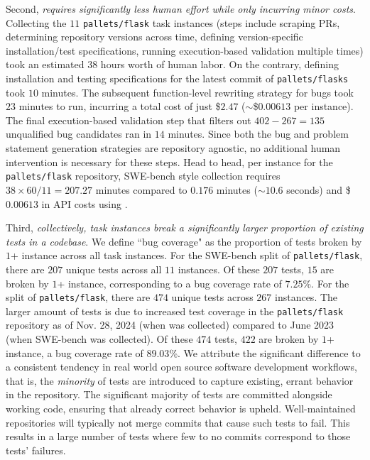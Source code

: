Second, \textit{\bugs{} requires significantly less human effort while only incurring minor costs}.
Collecting the $11$ \texttt{pallets/flask} task instances (steps include scraping PRs, determining repository versions across time, defining version-specific installation/test specifications, running execution-based validation multiple times) took an estimated $38$ hours worth of human labor.
On the contrary, defining installation and testing specifications for the latest commit of \texttt{pallets/flasks} took $10$ minutes. 
The subsequent function-level rewriting strategy for bugs took $23$ minutes to run, incurring a total cost of just \$$2.47$ ($\sim$\$$0.00613$ per instance).
The final execution-based validation step that filters out $402 - 267 = 135$ unqualified bug candidates ran in $14$ minutes.
Since both the bug and problem statement generation strategies are repository agnostic, no additional human intervention is necessary for these steps.
Head to head, per instance for the \texttt{pallets/flask} repository, SWE-bench style collection requires $38 \times 60 / 11 = 207.27$ minutes compared to $0.176$ minutes ($\sim10.6$ seconds) and \$$0.00613$ in API costs using \bugs{}.

Third, \textit{collectively, \bugs{} task instances break a significantly larger proportion of existing tests in a codebase}.
We define ``bug coverage" as the proportion of tests broken by $1$+ instance across all task instances.
For the SWE-bench split of \texttt{pallets/flask}, there are $207$ unique tests across all $11$ instances.
Of these $207$ tests, $15$ are broken by $1$+ instance, corresponding to a bug coverage rate of $7.25$\%.
For the \bugs{} split of \texttt{pallets/flask}, there are $474$ unique tests across $267$ instances.
The larger amount of tests is due to increased test coverage in the \texttt{pallets/flask} repository as of Nov. 28, 2024 (when \bugs{} was collected) compared to June 2023 (when SWE-bench was collected).
Of these $474$ tests, $422$ are broken by $1$+ instance, a bug coverage rate of $89.03$\%.
We attribute the significant difference to a consistent tendency in real world open source software development workflows, that is, the \textit{minority} of tests are introduced to capture existing, errant behavior in the repository.
The significant majority of tests are committed alongside working code, ensuring that already correct behavior is upheld.
Well-maintained repositories will typically not merge commits that cause such tests to fail.
This results in a large number of tests where few to no commits correspond to those tests' failures.

